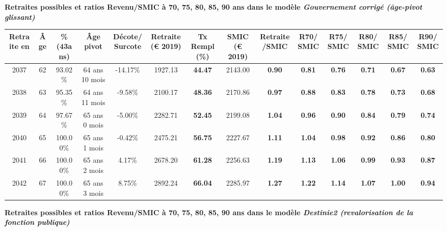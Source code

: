  \vspace{0.1cm} 
{\bf \noindent Retraites possibles et ratios Revenu/SMIC à 70, 75, 80, 85, 90 ans dans le modèle \emph{Gouvernement corrigé (âge-pivot glissant)}}  
 
\begin{adjustbox}{max width=\textwidth} 
\begin{tabular}[htb]{|c|c||c|c|c||c|c||c|c||c|c|c|c|c|} 
\hline 
 Retraite en &  Âge &  \%(43ans) &  Âge pivot &  Décote/Surcote &  Retraite (\euro{} 2019) &  Tx Rempl(\%) &  SMIC (\euro{} 2019) &  Retraite/SMIC &  R70/SMIC &  R75/SMIC &  R80/SMIC &  R85/SMIC &  R90/SMIC \\ 
\hline \hline 
 2037 &  62 &  93.02\% &  64 ans 10 mois &  -14.17\% &  1927.13 &  {\bf 44.47} &  2143.00 &  {\bf {\color{red} 0.90}} &  {\bf {\color{red} 0.81}} &  {\bf {\color{red} 0.76}} &  {\bf {\color{red} 0.71}} &  {\bf {\color{red} 0.67}} &  {\bf {\color{red} 0.63}} \\ 
\hline 
 2038 &  63 &  95.35\% &  64 ans 11 mois &  -9.58\% &  2100.17 &  {\bf 48.36} &  2170.86 &  {\bf {\color{red} 0.97}} &  {\bf {\color{red} 0.88}} &  {\bf {\color{red} 0.83}} &  {\bf {\color{red} 0.78}} &  {\bf {\color{red} 0.73}} &  {\bf {\color{red} 0.68}} \\ 
\hline 
 2039 &  64 &  97.67\% &  65 ans 0 mois &  -5.00\% &  2282.71 &  {\bf 52.45} &  2199.08 &  {\bf 1.04} &  {\bf {\color{red} 0.96}} &  {\bf {\color{red} 0.90}} &  {\bf {\color{red} 0.84}} &  {\bf {\color{red} 0.79}} &  {\bf {\color{red} 0.74}} \\ 
\hline 
 2040 &  65 &  100.00\% &  65 ans 1 mois &  -0.42\% &  2475.21 &  {\bf 56.75} &  2227.67 &  {\bf 1.11} &  {\bf 1.04} &  {\bf {\color{red} 0.98}} &  {\bf {\color{red} 0.92}} &  {\bf {\color{red} 0.86}} &  {\bf {\color{red} 0.80}} \\ 
\hline 
 2041 &  66 &  100.00\% &  65 ans 2 mois &  4.17\% &  2678.20 &  {\bf 61.28} &  2256.63 &  {\bf 1.19} &  {\bf 1.13} &  {\bf 1.06} &  {\bf {\color{red} 0.99}} &  {\bf {\color{red} 0.93}} &  {\bf {\color{red} 0.87}} \\ 
\hline 
 2042 &  67 &  100.00\% &  65 ans 3 mois &  8.75\% &  2892.24 &  {\bf 66.04} &  2285.97 &  {\bf 1.27} &  {\bf 1.22} &  {\bf 1.14} &  {\bf 1.07} &  {\bf 1.00} &  {\bf {\color{red} 0.94}} \\ 
\hline 
\hline 
\end{tabular} 
\end{adjustbox} 
 
 \vspace{0.1cm} 
{\bf \noindent Retraites possibles et ratios Revenu/SMIC à 70, 75, 80, 85, 90 ans dans le modèle \emph{Destinie2 (revalorisation de la fonction publique)}}  
 
